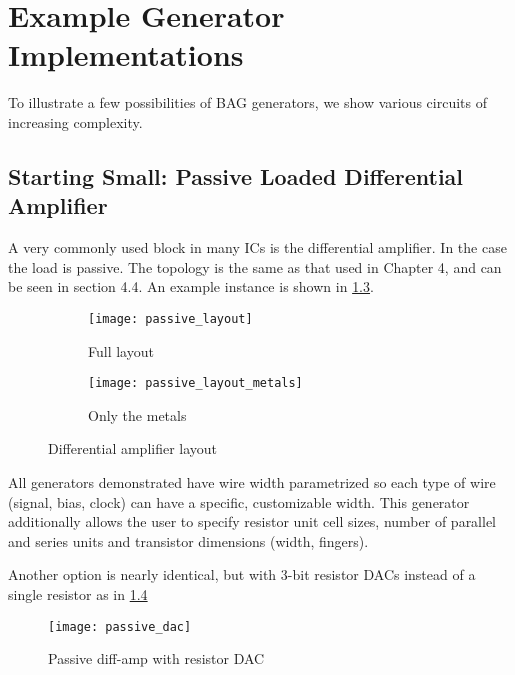 \chapter{Example Generator Implementations}
To illustrate a few possibilities of BAG generators, we show various circuits of increasing complexity. 
\section{Starting Small: Passive Loaded Differential Amplifier}
A very commonly used block in many ICs is the differential amplifier. In the case the load is passive. The topology is the same as that used in Chapter 4, and can be seen in section 4.4. An example instance is shown in \ref{fig:passive_amp}.
\begin{figure}[h]
\centering
\begin{subfigure}{.8\linewidth}
  \centering
  \texttt{[image: passive\_layout]}
  \caption{Full layout}
  \label{fig:sfig1}
\end{subfigure}
\begin{subfigure}{.8\linewidth}
  \centering
\texttt{[image: passive\_layout\_metals]}
  \caption{Only the metals}
  \label{fig:sfig2}
\end{subfigure}
\caption{Differential amplifier layout}
\label{fig:passive_amp}
\end{figure}
\clearpage
All generators demonstrated have wire width parametrized so each type of wire (signal, bias, clock) can have a specific, customizable width. This generator additionally allows the user to specify resistor unit cell sizes, number of parallel and series units and transistor dimensions (width, fingers).

Another option is nearly identical, but with 3-bit resistor DACs instead of a single resistor as in \ref{fig:passive_dac}
\begin{figure}[h]
\centering
\texttt{[image: passive\_dac]}
\caption{Passive diff-amp with resistor DAC}
\label{fig:passive_dac}
\end{figure}


